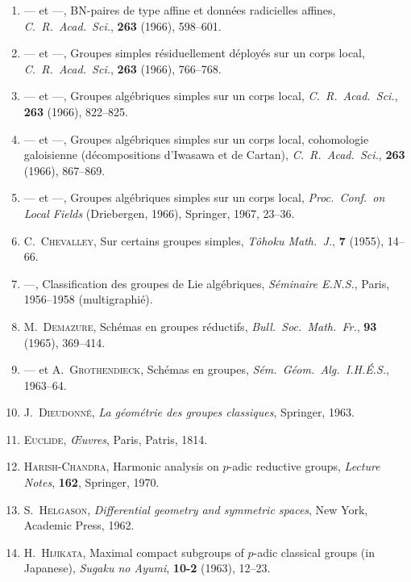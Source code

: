 \documentclass[12pt,a4paper,oneside,english]{smfart}
\theoremstyle{definition}
\theoremstyle{bt}
\begin{document}
\begin{enumerate}[leftmargin=3.4em,labelwidth=3em,labelsep=0.4em,align=left,itemsep=1pt]
\item[{[12]}]\hypertarget{bib:12}{} --- et ---, BN-paires de type affine et données radicielles affines, \emph{C.\ R.\ Acad.\ Sci.}, \textbf{263} (1966), 598--601.
\item[{[13]}]\hypertarget{bib:13}{} --- et ---, Groupes simples résiduellement déployés sur un corps local, \emph{C.\ R.\ Acad.\ Sci.}, \textbf{263} (1966), 766--768.
\item[{[14]}]\hypertarget{bib:14}{} --- et ---, Groupes algébriques simples sur un corps local, \emph{C.\ R.\ Acad.\ Sci.}, \textbf{263} (1966), 822--825.
\item[{[15]}]\hypertarget{bib:15}{} --- et ---, Groupes algébriques simples sur un corps local, cohomologie galoisienne (décompositions d'Iwasawa et de Cartan), \emph{C.\ R.\ Acad.\ Sci.}, \textbf{263} (1966), 867--869.
\item[{[16]}]\hypertarget{bib:16}{} --- et ---, Groupes algébriques simples sur un corps local, \emph{Proc.\ Conf.\ on Local Fields} (Driebergen, 1966), Springer, 1967, 23--36.
\item[{[17]}]\hypertarget{bib:17}{} C.~\textsc{Chevalley}, Sur certains groupes simples, \emph{Tôhoku Math.\ J.}, \textbf{7} (1955), 14--66.
\item[{[18]}]\hypertarget{bib:18}{} ---, Classification des groupes de Lie algébriques, \emph{Séminaire E.N.S.}, Paris, 1956--1958 (multigraphié).
\item[{[19]}]\hypertarget{bib:19}{} M.~\textsc{Demazure}, Schémas en groupes réductifs, \emph{Bull.\ Soc.\ Math.\ Fr.}, \textbf{93} (1965), 369--414.
\item[{[20]}]\hypertarget{bib:20}{} --- et A.~\textsc{Grothendieck}, Schémas en groupes, \emph{Sém.\ Géom.\ Alg.\ I.H.É.S.}, 1963--64.
\item[{[21]}]\hypertarget{bib:21}{} J.~\textsc{Dieudonné}, \emph{La géométrie des groupes classiques}, Springer, 1963.
\item[{[22]}]\hypertarget{bib:22}{} \textsc{Euclide}, \emph{\OE uvres}, Paris, Patris, 1814.
\item[{[23]}]\hypertarget{bib:23}{} \textsc{Harish-Chandra}, Harmonic analysis on $p$-adic reductive groups, \emph{Lecture Notes}, \textbf{162}, Springer, 1970.
\item[{[24]}]\hypertarget{bib:24}{} S.~\textsc{Helgason}, \emph{Differential geometry and symmetric spaces}, New York, Academic Press, 1962.
\item[{[25]}]\hypertarget{bib:25}{} H.~\textsc{Hijikata}, Maximal compact subgroups of $p$-adic classical groups (in Japanese), \emph{Sugaku no Ayumi}, \textbf{10-2} (1963), 12--23.

\end{enumerate}
\end{document}
